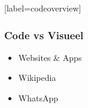 \documentclass[presentatie.tex]{subfiles}
\def\named#1{}
\begin{document}
    \let\frameselection\somethingundefined
    
    \named{intro-visueelcomp}
    
    \ifx\frameselection\somethingundefined
        \def\frameselection{1-4}
    \fi

    \def\pasteframeselection#1{\begin{frame}<#1>}%
    \expandafter\pasteframeselection\expandafter{\frameselection}%
    [label=codeoverview]
        \frametitle{Code vs Visueel}

        \parbox[c][0.8\textheight]{0.35\textwidth}{
            \begin{itemize}
                \item<1-> Websites \& Apps
                \par{}                    
                
                \item<4-> Wikipedia
                \par{}

                \item<6-> WhatsApp
                \par{}
            \end{itemize}
        }\hfil
        \hfil
\end{document}
